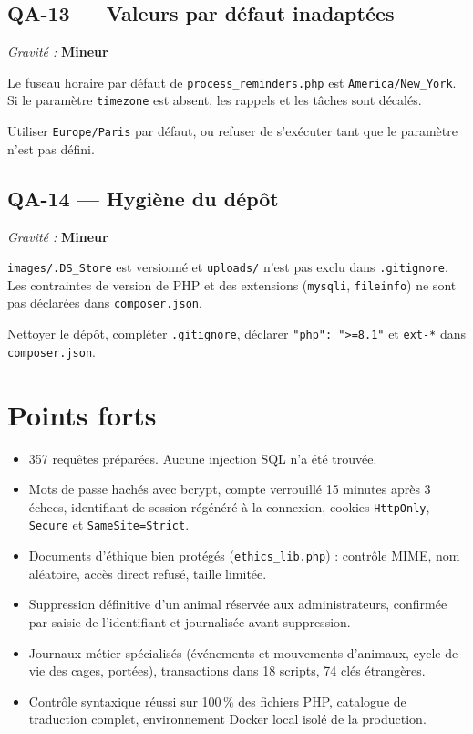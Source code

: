 \documentclass[11pt,a4paper]{article}
\newcommand{\mineur}{\textcolor{min}{\textbf{Mineur}}}
\newcommand{\f}[1]{\nolinkurl{#1}}
\newenvironment{constat}[3]{%
  \subsection*{#1 --- #2}\noindent\textit{Gravité :} #3\par\smallskip
  \begin{description}[leftmargin=2.6cm,style=nextline,itemsep=2pt]}{\end{description}}
\begin{document}
\begin{constat}{QA-13}{Valeurs par défaut inadaptées}{\mineur}
\item[Preuve] Le fuseau horaire par défaut de \f{process_reminders.php} est
  \f{America/New_York}. Si le paramètre \f{timezone} est absent, les rappels et
  les tâches sont décalés.
\item[Action] Utiliser \f{Europe/Paris} par défaut, ou refuser de s'exécuter
  tant que le paramètre n'est pas défini.
\end{constat}

\begin{constat}{QA-14}{Hygiène du dépôt}{\mineur}
\item[Preuve] \f{images/.DS_Store} est versionné et \f{uploads/} n'est pas exclu
  dans \f{.gitignore}. Les contraintes de version de PHP et des extensions
  (\f{mysqli}, \f{fileinfo}) ne sont pas déclarées dans \f{composer.json}.
\item[Action] Nettoyer le dépôt, compléter \f{.gitignore}, déclarer
  \texttt{"php": ">=8.1"} et \f{ext-*} dans \f{composer.json}.
\end{constat}

\section{Points forts}

\begin{itemize}[nosep]
  \item 357 requêtes préparées. Aucune injection SQL n'a été trouvée.
  \item Mots de passe hachés avec bcrypt, compte verrouillé 15 minutes après
    3 échecs, identifiant de session régénéré à la connexion, cookies
    \f{HttpOnly}, \f{Secure} et \f{SameSite=Strict}.
  \item Documents d'éthique bien protégés (\f{ethics_lib.php}) : contrôle MIME,
    nom aléatoire, accès direct refusé, taille limitée.
  \item Suppression définitive d'un animal réservée aux administrateurs,
    confirmée par saisie de l'identifiant et journalisée avant suppression.
  \item Journaux métier spécialisés (événements et mouvements d'animaux, cycle de
    vie des cages, portées), transactions dans 18 scripts, 74 clés étrangères.
  \item Contrôle syntaxique réussi sur 100\,\% des fichiers PHP, catalogue de
    traduction complet, environnement Docker local isolé de la production.
\end{itemize}
\end{document}
